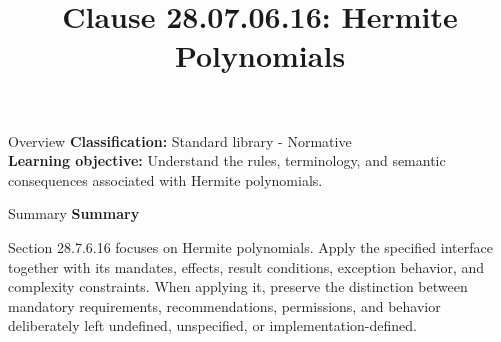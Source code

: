 \documentclass[10pt,letterpaper]{article}
\title{Clause 28.07.06.16: Hermite Polynomials}
\author{}
\date{}
\begin{document}
\maketitle
\begin{CornellOverviewBox}{Overview}
\textbf{Classification:} Standard library - Normative\\[2pt]
\textbf{Learning objective:} Understand the rules, terminology, and semantic consequences associated with Hermite polynomials.
\end{CornellOverviewBox}\begin{CornellSummaryBox}{Summary}
{\sffamily\bfseries\color{Accent} Summary}\par\vspace{3pt}Section 28.7.6.16 focuses on Hermite polynomials. Apply the specified interface together with its mandates, effects, result conditions, exception behavior, and complexity constraints. When applying it, preserve the distinction between mandatory requirements, recommendations, permissions, and behavior deliberately left undefined, unspecified, or implementation-defined.
\end{CornellSummaryBox}
\end{document}
